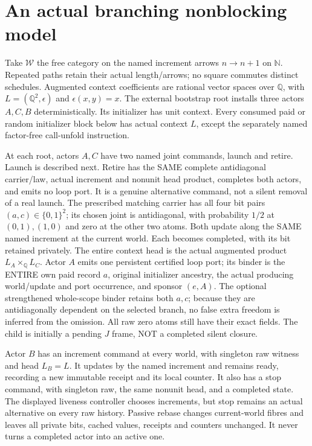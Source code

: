 \documentclass[11pt]{article}\usepackage{amsmath,amssymb,amsthm}
\begin{document}
\section{An actual branching nonblocking model}
Take $\mathcal W$ the free category on the named increment arrows $n\to n+1$ on $\mathbb N$. Repeated paths retain their actual length/arrows; no square commutes distinct schedules. Augmented context coefficients are rational vector spaces over $\mathbb Q$, with $L=(\mathbb Q^2,\epsilon)$ and $\epsilon(x,y)=x$. The external bootstrap root installs three actors $A,C,B$ deterministically. Its initializer has unit context. Every consumed paid or random initializer block below has actual context $L$, except the separately named factor-free call-unfold instruction.

At each root, actors $A,C$ have two named joint commands, launch and retire. Launch is described next. Retire has the SAME complete antidiagonal carrier/law, actual increment and nonunit head product, completes both actors, and emits no loop port. It is a genuine alternative command, not a silent removal of a real launch. The prescribed matching carrier has all four bit pairs $(a,c)\in\{0,1\}^2$; its chosen joint is antidiagonal, with probability $1/2$ at $(0,1),(1,0)$ and zero at the other two atoms. Both update along the SAME named increment at the current world. Each becomes completed, with its bit retained privately. The entire context head is the actual augmented product $L_A\times_{\mathbb Q}L_C$. Actor $A$ emits one persistent certified loop port; its binder is the ENTIRE own paid record $a$, original initializer ancestry, the actual producing world/update and port occurrence, and sponsor $(e,A)$. The optional strengthened whole-scope binder retains both $a,c$; because they are antidiagonally dependent on the selected branch, no false extra freedom is inferred from the omission. All raw zero atoms still have their exact fields. The child is initially a pending $J$ frame, NOT a completed silent closure.

Actor $B$ has an increment command at every world, with singleton raw witness and head $L_B=L$. It updates by the named increment and remains ready, recording a new immutable receipt and its local counter. It also has a stop command, with singleton raw, the same nonunit head, and a completed state. The displayed liveness controller chooses increments, but stop remains an actual alternative on every raw history. Passive rebase changes current-world fibres and leaves all private bits, cached values, receipts and counters unchanged. It never turns a completed actor into an active one.
\end{document}
